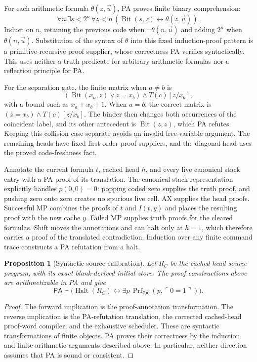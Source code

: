\documentclass[11pt]{article}
\newtheorem{proposition}[theorem]{Proposition}
\newcommand{\PA}{\mathsf{PA}}
\newcommand{\Prf}{\operatorname{Prf}}
\newcommand{\Halt}{\operatorname{Halt}}
\begin{document}
For each arithmetic formula $\theta(z,\vec u)$, PA proves finite binary
comprehension:
\[
\forall n\,\exists s<2^n\,\forall z<n\,
 (\operatorname{Bit}(s,z)\leftrightarrow\theta(z,\vec u)).
\]
Induct on $n$, retaining the previous code when $\neg\theta(n,\vec u)$
and adding $2^n$ when $\theta(n,\vec u)$. Substitution of the syntax of
$\theta$ into this fixed induction-proof pattern is a primitive-recursive
proof supplier, whose correctness PA verifies syntactically. This uses
neither a truth predicate for arbitrary arithmetic formulas nor a
reflection principle for PA.

For the separation gate, the finite matrix when $a\ne b$ is
\[
(\operatorname{Bit}(x_a,z)\lor z=x_b)\wedge T(c)[z/x_b],
\]
with a bound such as $x_a+x_b+1$. When $a=b$, the correct matrix is
$(z=x_b)\wedge T(c)[z/x_b]$. The binder then changes both occurrences
of the coincident label, and its other antecedent is
$\operatorname{Bit}(z,z)$, which PA refutes. Keeping this collision case
separate avoids an invalid free-variable argument. The remaining heads
have fixed first-order proof suppliers, and the diagonal head uses the
proved code-freshness fact.

Annotate the current formula $t$, cached head $h$, and every live canonical
stack entry with a PA proof of its translation. The canonical stack
representation explicitly handles $p(0,0)=0$: popping coded zero supplies
the truth proof, and pushing zero onto zero creates no spurious live cell.
AX supplies the head proofs. Successful MP combines the proofs of $t$
and $I(t,y)$ and places the resulting proof with the new cache $y$.
Failed MP supplies truth proofs for the cleared formulas. Shift moves
the annotations and can halt only at $h=1$, which therefore carries a
proof of the translated contradiction. Induction over any finite command
trace constructs a PA refutation from a halt.

\begin{proposition}[Syntactic source calibration]
Let $R_C$ be the cached-head source program, with its exact blank-derived
initial store. The proof constructions above are arithmetizable in PA and
give
\[
\PA\vdash\bigl(\Halt(R_C)\leftrightarrow
\exists p\,\Prf_{\PA}(p,\ulcorner0=1\urcorner)\bigr).
\]
\end{proposition}
\begin{proof}
The forward implication is the proof-annotation transformation. The reverse
implication is the PA-refutation translation, the corrected cached-head
proof-word compiler, and the exhaustive scheduler. These are syntactic
transformations of finite objects. PA proves their correctness by the
induction and finite arithmetic arguments described above. In particular,
neither direction assumes that PA is sound or consistent.
\end{proof}
\end{document}
